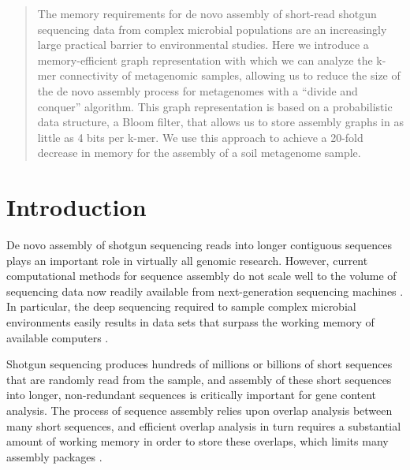\documentclass{pnastwo}
\begin{document}
\begin{article}

\begin{abstract}

The memory requirements for de novo assembly of short-read shotgun
sequencing data from complex microbial populations are an increasingly
large practical barrier to environmental studies.  Here we introduce a
memory-efficient graph representation with which we can analyze the
k-mer connectivity of metagenomic samples, allowing us to reduce the
size of the de novo assembly process for metagenomes with a ``divide and
conquer'' algorithm.  This graph representation is based on a
probabilistic data structure, a Bloom filter, that allows us to store
assembly graphs in as little as 4 bits per k-mer.  We use this
approach to achieve a 20-fold decrease in memory for the assembly of a
soil metagenome sample.

\end{abstract}


\section{Introduction}

De novo assembly of shotgun sequencing reads into longer contiguous
sequences plays an important role in virtually all genomic research.
However, current computational methods for sequence assembly do not
scale well to the volume of sequencing data now readily available from
next-generation sequencing machines \cite{pubmed22147368}.  In particular, the deep
sequencing required to sample complex microbial environments easily
results in data sets that surpass the working memory of available
computers \cite{metahit,rumen}.

Shotgun sequencing produces hundreds of millions or billions of short
sequences that are randomly read from the sample, and assembly of
these short sequences into longer, non-redundant sequences is
critically important for gene content analysis.  The process of
sequence assembly relies upon overlap analysis between many short
sequences, and efficient overlap analysis in turn requires a
substantial amount of working memory in order to store these overlaps,
which limits many assembly packages \cite{pubmed22147368}.


\end{article}
\end{document}

